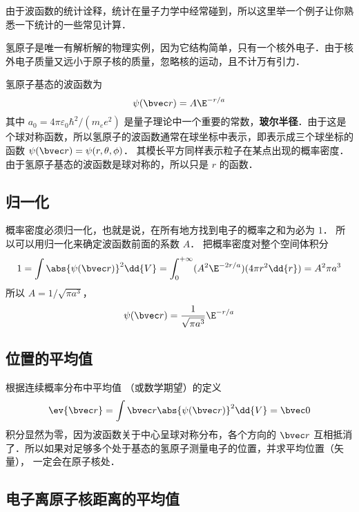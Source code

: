 

由于波函数的统计诠释，统计在量子力学中经常碰到，所以这里举一个例子让你熟悉一下统计的一些常见计算．

氢原子是唯一有解析解的物理实例，因为它结构简单，只有一个核外电子．由于核外电子质量又远小于原子核的质量，忽略核的运动，且不计万有引力．

氢原子基态的波函数为
\begin{equation}
\psi(\bvec r) = A\E^{-r/a}
\end{equation}
其中 $a_0 = 4\pi\varepsilon_0 \hbar ^2/(m_e e^2)$ 是量子理论中一个重要的常数，\textbf{玻尔半径}．由于这是个球对称函数，所以氢原子的波函数通常在球坐标中表示，即表示成三个球坐标的函数 $\psi (\bvec r) = \psi (r, \theta, \phi)$． 其模长平方同样表示粒子在某点出现的概率密度．由于氢原子基态的波函数是球对称的，所以只是 $r$ 的函数．

\subsection{归一化}
  
概率密度必须归一化，也就是说，在所有地方找到电子的概率之和为必为 $1$． 所以可以用归一化来确定波函数前面的系数 $A$． 把概率密度对整个空间体积分
\begin{equation}
1 = \int \abs{\psi(\bvec r)} ^2 \dd{V}  = \int_0^{+\infty} (A^2 \E^{-2r/a})(4\pi r^2\dd{r})  = A^2 \pi a^3
\end{equation}
所以 $A = 1/\sqrt{\pi a^3}$， 
\begin{equation}
\psi (\bvec r) = \frac{1}{\sqrt{\pi a^3}} \E^{-r/a}
\end{equation}

\subsection{位置的平均值}

 根据连续概率分布中平均值%
（或数学期望）的定义
\begin{equation}
\ev{\bvec r} = \int \bvec r \abs{\psi (\bvec r)} ^2 \dd{V} =  \bvec 0
\end{equation}
积分显然为零，因为波函数关于中心呈球对称分布，各个方向的 $\bvec r$ 互相抵消了．所以如果对足够多个处于基态的氢原子测量电子的位置，并求平均位置（矢量）， 一定会在原子核处．

\subsection{电子离原子核距离的平均值}

